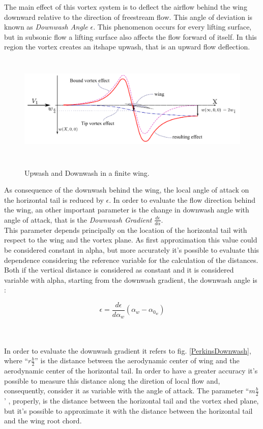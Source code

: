 The main effect of this vortex system is to deflect the airflow behind the wing downward relative to the direction of freestream flow. This angle of deviation is known as {\itshape Downwash Angle} $\epsilon$. This phenomenon occurs for every lifting surface, but in subsonic flow a lifting surface also affects the flow forward of itself. In this region the vortex creates an {itshape upwash}, that is an upward flow deflection.\\


\begin{figure}[H]
\centering
{\includegraphics[height=5.16cm]{Immagini/wing_upwash_downwash.pdf}} 
\caption{Upwash and Downwash in a finite wing.}
\end{figure}

As consequence of the downwash behind the wing, the local angle of attack on the horizontal tail is reduced by  $\epsilon$. In order to evaluate the flow direction behind the wing, an other important parameter is the change in downwash angle with angle of attack, that is the {\itshape Downwash Gradient } $\frac{d\epsilon}{d\alpha}$.\\
This parameter depends principally on the location of the horizontal tail with respect to the wing and the vortex plane. As first approximation this value could be considered constant in alpha, but more accurately it's possible to evaluate this dependence considering the reference variable for the calculation of the distances. 
Both if the vertical distance is considered as constant and it is considered variable with alpha, starting from the downwash gradient, the downwash angle is :

\begin{equation}
\epsilon = \frac {d \epsilon}{d \alpha_w} (\alpha_w - \alpha_{0_w})
\end{equation}

\noindent \\ \\
In order to evaluate the downwash gradient it refers to fig. \ref{PerkinsDownwash}, where ``$r \frac{b}{2}$''  is the distance between the aerodynamic center of wing and the aerodynamic center of the horizontal tail. In order to have a greater accuracy it's possible to measure this distance along the diretion of local flow and, consequently, consider it as variable with the angle of attack. The parameter ``$m\frac{b}{2}$' , properly, is the distance between the horizontal tail and the vortex shed plane, but it's possible to approximate it with the distance between the horizontal tail and the wing root chord.\cite{schimidth}

